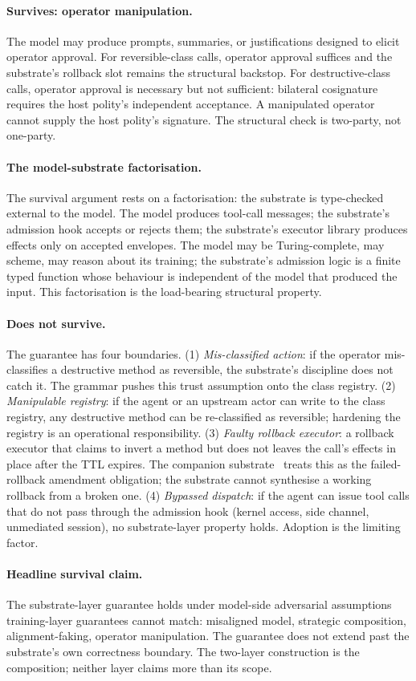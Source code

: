 \paragraph{Survives: operator manipulation.}
The model may produce prompts, summaries, or justifications designed to elicit operator approval. For reversible-class calls, operator approval suffices and the substrate's rollback slot remains the structural backstop. For destructive-class calls, operator approval is necessary but not sufficient: bilateral cosignature requires the host polity's independent acceptance. A manipulated operator cannot supply the host polity's signature. The structural check is two-party, not one-party.

\paragraph{The model-substrate factorisation.}
The survival argument rests on a factorisation: the substrate is type-checked external to the model. The model produces tool-call messages; the substrate's admission hook accepts or rejects them; the substrate's executor library produces effects only on accepted envelopes. The model may be Turing-complete, may scheme, may reason about its training; the substrate's admission logic is a finite typed function whose behaviour is independent of the model that produced the input. This factorisation is the load-bearing structural property.

\paragraph{Does not survive.}
The guarantee has four boundaries. (1) \emph{Mis-classified action}: if the operator mis-classifies a destructive method as reversible, the substrate's discipline does not catch it. The grammar pushes this trust assumption onto the class registry. (2) \emph{Manipulable registry}: if the agent or an upstream actor can write to the class registry, any destructive method can be re-classified as reversible; hardening the registry is an operational responsibility. (3) \emph{Faulty rollback executor}: a rollback executor that claims to invert a method but does not leaves the call's effects in place after the TTL expires. The companion substrate~\cite{programmableSovereignty2026} treats this as the failed-rollback amendment obligation; the substrate cannot synthesise a working rollback from a broken one. (4) \emph{Bypassed dispatch}: if the agent can issue tool calls that do not pass through the admission hook (kernel access, side channel, unmediated session), no substrate-layer property holds. Adoption is the limiting factor.

\paragraph{Headline survival claim.}
The substrate-layer guarantee holds under model-side adversarial assumptions training-layer guarantees cannot match: misaligned model, strategic composition, alignment-faking, operator manipulation. The guarantee does not extend past the substrate's own correctness boundary. The two-layer construction is the composition; neither layer claims more than its scope.
